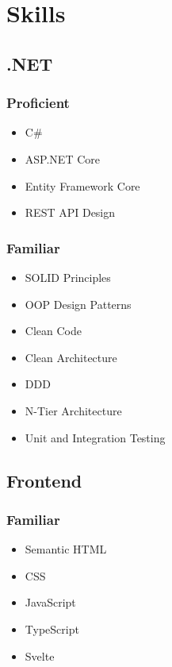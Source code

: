 \documentclass{cv}
\begin{document}
\begin{minipage}[t]{.3\textwidth}
    \section{Skills}

    \subsection{.NET}

    \subsubsection{Proficient}

    \begin{itemize}
        \item C\#
        \item ASP.NET Core
        \item Entity Framework Core
        \item REST API Design
    \end{itemize}

    \subsubsection{Familiar}

    \begin{itemize}
        \item SOLID Principles
        \item OOP Design Patterns
        \item Clean Code
        \item Clean Architecture
        \item DDD
        \item N-Tier Architecture
        \item Unit and Integration Testing
    \end{itemize}

    \subsection{Frontend}

    \subsubsection{Familiar}

    \begin{itemize}
        \item Semantic HTML
        \item CSS
        \item JavaScript
        \item TypeScript
        \item Svelte
    \end{itemize}


\end{minipage}
\end{document}
